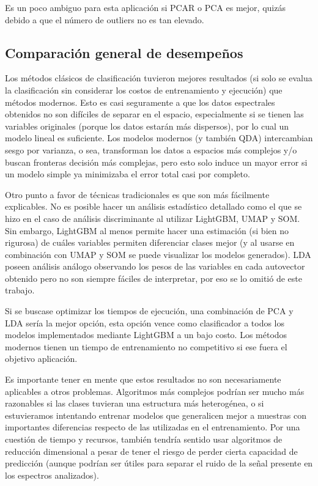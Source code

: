 \documentclass[12pt]{article}
\begin{document}
Es un poco ambiguo para esta aplicación si PCAR o PCA es mejor, quizás debido a que el número de outliers no es tan elevado.

\subsection{Comparación general de desempeños}
Los métodos clásicos de clasificación tuvieron mejores resultados (si solo se evalua la clasificación sin considerar los costos de entrenamiento y ejecución) que métodos modernos. Esto es casi seguramente a que los datos espectrales obtenidos no son difíciles de separar en el espacio, especialmente si se tienen las variables originales (porque los datos estarán más dispersos), por lo cual un modelo lineal es suficiente. Los modelos modernos (y también QDA) intercambian sesgo por varianza, o sea, transforman los datos a espacios más complejos y/o buscan fronteras decisión más complejas, pero esto solo induce un mayor error si un modelo simple ya minimizaba el error total casi por completo. 

Otro punto a favor de técnicas tradicionales es que son más fácilmente explicables. No es posible hacer un análisis estadístico detallado como el que se hizo en el caso de análisis discriminante al utilizar LightGBM, UMAP y SOM. Sin embargo, LightGBM al menos permite hacer una estimación (si bien no rigurosa) de cuáles variables permiten diferenciar clases mejor (y al usarse en combinación con UMAP y SOM se puede visualizar los modelos generados). LDA poseen análisis análogo observando los pesos de las variables en cada autovector obtenido pero no son siempre fáciles de interpretar, por eso se lo omitió de este trabajo.

Si se buscase optimizar los tiempos de ejecución, una combinación de PCA y LDA sería la mejor opción, esta opción vence como clasificador a todos los modelos implementados mediante LightGBM a un bajo costo. Los métodos modernos tienen un tiempo de entrenamiento no competitivo si ese fuera el objetivo aplicación.

Es importante tener en mente que estos resultados no son necesariamente aplicables a otros problemas. Algoritmos más complejos podrían ser mucho más razonables si las clases tuvieran una estructura más heterogénea, o si estuvieramos intentando entrenar modelos que generalicen mejor a muestras con importantes diferencias respecto de las utilizadas en el entrenamiento. Por una cuestión de tiempo y recursos, también tendría sentido usar algoritmos de reducción dimensional a pesar de tener el riesgo de perder cierta capacidad de predicción (aunque podrían ser útiles para separar el ruido de la señal presente en los espectros analizados).
\end{document}
